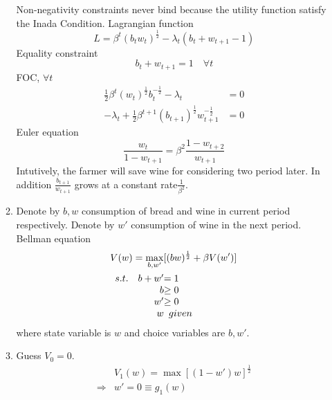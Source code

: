 \documentclass{article}
\begin{document}
\begin{enumerate}
\begin{enumerate}
            Non-negativity constraints never bind because the utility function satisfy the Inada Condition.
            Lagrangian function
            \begin{equation*}
                L=\beta^t(b_tw_t)^{\frac{1}{2}}-\lambda_t(b_t+w_{t+1}-1)
            \end{equation*}
            Equality constraint
            \begin{equation*}
                b_t+w_{t+1}=1\quad\forall t
            \end{equation*}
            FOC, $\forall t$
            \begin{align*}
                \frac{1}{2}\beta^t(w_t)^{\frac{1}{2}}b_t^{-\frac{1}{2}}-\lambda_t&=0\\
                -\lambda_t+\frac{1}{2}\beta^{t+1}(b_{t+1})^{\frac{1}{2}}w_{t+1}^{-\frac{1}{2}}&=0
            \end{align*}
            Euler equation
            \begin{equation*}
                \frac{w_t}{1-w_{t+1}}=\beta^2\frac{1-w_{t+2}}{w_{t+1}}
            \end{equation*}
            Intutively, the farmer will save wine for considering two period later. In addition $\frac{b_{t+1}}{w_{t+1}}$ grows at a constant rate$\frac{1}{\beta^2}$.
            \item Denote by $b,w$ consumption of bread and wine in current period respectively. Denote by $w'$ consumption of wine in the next period.\\
            Bellman equation
            \begin{align*}
                &V(w)=\max_{b,w'}[(bw)^\frac{1}{2}+\beta V(w')]\\
                &\begin{array}{r@{\quad}r@{}l}
                    s.t.&b+w'&=1\\
                    &b&\ge0\\
                    &w'&\ge0\\
                    &w&\enspace given
                \end{array}
            \end{align*}
            where state variable is $w$ and choice variables are $b,w'$.
            \item Guess $V_0=0$.
            \begin{align*}
                &V_1(w)=\max[(1-w')w]^\frac{1}{2}\\
                \Rightarrow &w'=0\equiv g_1(w)\\

\end{align*}
\end{enumerate}
\end{enumerate}
\end{document}
